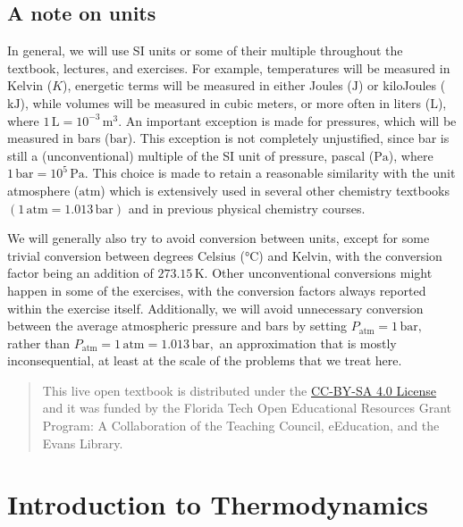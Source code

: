 \documentclass[
  9pt,
]{extbook}
\let\origdoublepage\cleardoublepage
\newcommand{\clearemptydoublepage}{%
  \clearpage
  {\pagestyle{empty}\origdoublepage}%
}
\let\cleardoublepage\clearemptydoublepage
\theoremstyle{definition}
\theoremstyle{definition}
\theoremstyle{definition}
\theoremstyle{definition}
\theoremstyle{remark}
\begin{document}
\section*{A note on units}\label{a-note-on-units}

In general, we will use SI units or some of their multiple throughout the textbook, lectures, and exercises. For example, temperatures will be measured in Kelvin (\(K\)), energetic terms will be measured in either Joules (\(\text{J}\)) or kiloJoules (\(\text{kJ}\)), while volumes will be measured in cubic meters, or more often in liters (\(\text{L}\)), where \(1\,\text{L} = 10^{-3}\,\text{m}^3\). An important exception is made for pressures, which will be measured in bars (\(\text{bar}\)). This exception is not completely unjustified, since bar is still a (unconventional) multiple of the SI unit of pressure, pascal (\(\text{Pa}\)), where \(1\,\text{bar} = 10^5\,\text{Pa}\). This choice is made to retain a reasonable similarity with the unit atmosphere (\(\text{atm}\)) which is extensively used in several other chemistry textbooks \((1\,\text{atm} = 1.013\,\text{bar})\) and in previous physical chemistry courses.

We will generally also try to avoid conversion between units, except for some trivial conversion between degrees Celsius (°C) and Kelvin, with the conversion factor being an addition of \(273.15\,\text{K}\). Other unconventional conversions might happen in some of the exercises, with the conversion factors always reported within the exercise itself.
Additionally, we will avoid unnecessary conversion between the average atmospheric pressure and bars by setting \(P_{\text{atm}} = 1\,\text{bar},\) rather than \(P_{\text{atm}} = 1\,\text{atm} = 1.013\, \text{bar},\) an approximation that is mostly inconsequential, at least at the scale of the problems that we treat here.

\begin{quote}
This live open textbook is distributed under the \href{https://creativecommons.org/licenses/by-sa/4.0/}{CC-BY-SA 4.0 License} and it was funded by the Florida Tech Open Educational Resources Grant Program: A Collaboration of the Teaching Council, eEducation, and the Evans Library.
\end{quote}

\cleardoublepage
{}

\chapter{Introduction to Thermodynamics}\label{SystemVariables}
\end{document}
